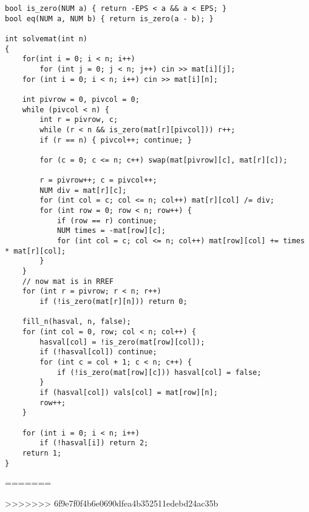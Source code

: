 \documentclass[8pt,a4paper,landscape,oneside]{amsart}
\begin{document}
\begin{multicols*}{3}
\begin{lstlisting}
bool is_zero(NUM a) { return -EPS < a && a < EPS; }
bool eq(NUM a, NUM b) { return is_zero(a - b); }

int solvemat(int n)
{
	for(int i = 0; i < n; i++)
		for (int j = 0; j < n; j++) cin >> mat[i][j];
	for (int i = 0; i < n; i++) cin >> mat[i][n];

	int pivrow = 0, pivcol = 0;
	while (pivcol < n) {
		int r = pivrow, c;
		while (r < n && is_zero(mat[r][pivcol])) r++;
		if (r == n) { pivcol++; continue; }

		for (c = 0; c <= n; c++) swap(mat[pivrow][c], mat[r][c]);

		r = pivrow++; c = pivcol++;
		NUM div = mat[r][c];
		for (int col = c; col <= n; col++) mat[r][col] /= div;
		for (int row = 0; row < n; row++) {
			if (row == r) continue;
			NUM times = -mat[row][c];
			for (int col = c; col <= n; col++) mat[row][col] += times * mat[r][col];
		}
	}
	// now mat is in RREF
	for (int r = pivrow; r < n; r++)
		if (!is_zero(mat[r][n])) return 0;

	fill_n(hasval, n, false);
	for (int col = 0, row; col < n; col++) {
		hasval[col] = !is_zero(mat[row][col]);
		if (!hasval[col]) continue;
		for (int c = col + 1; c < n; c++) {
			if (!is_zero(mat[row][c])) hasval[col] = false;
		}
		if (hasval[col]) vals[col] = mat[row][n];
		row++;
	}

	for (int i = 0; i < n; i++)
		if (!hasval[i]) return 2;
	return 1;
}
\end{lstlisting}
\end{multicols*}
=======


>>>>>>> 6f9e7f0f4b6e0690dfea4b352511edebd24ac35b
\end{document}
